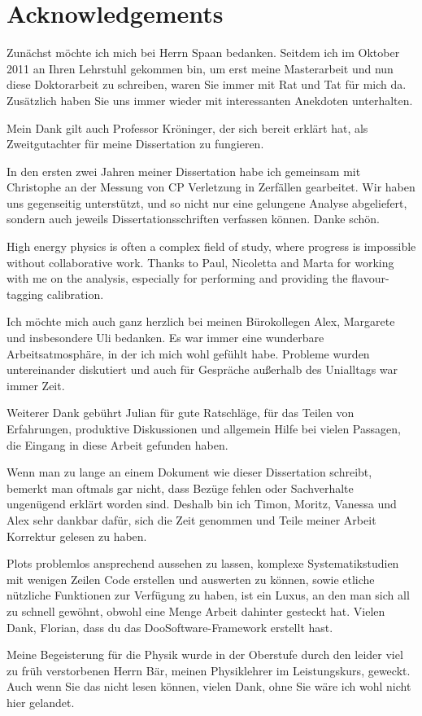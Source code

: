 
\chapter*{Acknowledgements}

Zunächst möchte ich mich bei Herrn Spaan bedanken. Seitdem ich im Oktober 2011
an Ihren Lehrstuhl gekommen bin, um erst meine Masterarbeit und nun diese
Doktorarbeit zu schreiben, waren Sie immer mit Rat und Tat für mich da.
Zusätzlich haben Sie uns immer wieder mit interessanten Anekdoten unterhalten.

Mein Dank gilt auch Professor Kröninger, der sich bereit erklärt hat, als
Zweitgutachter für meine Dissertation zu fungieren.

In den ersten zwei Jahren meiner Dissertation habe ich gemeinsam mit
Christophe an der Messung von CP Verletzung in \BdToJPsiKS Zerfällen
gearbeitet. Wir haben uns gegenseitig unterstützt, und so nicht nur eine
gelungene Analyse abgeliefert, sondern auch jeweils Dissertationsschriften
verfassen können. Danke schön.

High energy physics is often a complex field of study, where progress is
impossible without collaborative work. Thanks to Paul, Nicoletta and Marta for
working with me on the \BdToDD analysis, especially for performing and
providing the flavour-tagging calibration.

Ich möchte mich auch ganz herzlich bei meinen Bürokollegen Alex, Margarete und
insbesondere Uli bedanken. Es war immer eine wunderbare Arbeitsatmosphäre, in
der ich mich wohl gefühlt habe. Probleme wurden untereinander diskutiert und
auch für Gespräche außerhalb des Unialltags war immer Zeit.

Weiterer Dank gebührt Julian für gute Ratschläge, für das Teilen von
Erfahrungen, produktive Diskussionen und allgemein Hilfe bei vielen Passagen,
die Eingang in diese Arbeit gefunden haben.

Wenn man zu lange an einem Dokument wie dieser Dissertation schreibt, bemerkt
man oftmals gar nicht, dass Bezüge fehlen oder Sachverhalte ungenügend erklärt
worden sind. Deshalb bin ich Timon, Moritz, Vanessa und Alex sehr dankbar
dafür, sich die Zeit genommen und Teile meiner Arbeit Korrektur gelesen zu
haben.

Plots problemlos ansprechend aussehen zu lassen, komplexe Systematikstudien
mit wenigen Zeilen Code erstellen und auswerten zu können, sowie etliche
nützliche Funktionen zur Verfügung zu haben, ist ein Luxus, an den man sich
all zu schnell gewöhnt, obwohl eine Menge Arbeit dahinter gesteckt hat. Vielen
Dank, Florian, dass du das DooSoftware-Framework erstellt hast.

Meine Begeisterung für die Physik wurde in der Oberstufe durch den leider viel
zu früh verstorbenen Herrn Bär, meinen Physiklehrer im Leistungskurs, geweckt.
Auch wenn Sie das nicht lesen können, vielen Dank, ohne Sie wäre ich wohl
nicht hier gelandet.